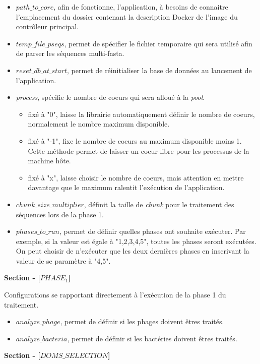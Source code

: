 \begin{itemize}
\item \emph{$path\_to\_core$}, afin de fonctionne, l'application, à besoins de connaitre l'emplacement du dossier contenant la description Docker de l'image du contrôleur principal.
\item \emph{$temp\_file\_pseqs$}, permet de spécifier le fichier temporaire qui sera utilisé afin de parser les séquences multi-fasta. 
\item \emph{$reset\_db\_at\_start$}, permet de réinitialiser la base de données au lancement de l'application.
\item \emph{process}, spécifie le nombre de coeurs qui sera alloué à la \emph{pool}. 
\begin{itemize}
\item fixé à "0", laisse la librairie automatiquement définir le nombre de coeurs, normalement le nombre maximum disponible.
\item fixé à "-1", fixe le nombre de coeurs au maximum disponible moins 1. Cette méthode permet de laisser un coeur libre pour les processus de la machine hôte.
\item fixé à "x", laisse choisir le nombre de coeurs, mais attention en mettre davantage que le maximum ralentit l'exécution de l'application.
\end{itemize}
\item \emph{$chunk\_size\_multiplier$}, définit la taille de \emph{chunk} pour le traitement des séquences lors de la phase 1.
\item \emph{$phases\_to\_run$}, permet de définir quelles phases ont souhaite exécuter. Par exemple, si la valeur est égale à "1,2,3,4,5", toutes les phases seront exécutées. On peut choisir de n'exécuter que les deux dernières phases en inscrivant la valeur de se paramètre à "4,5".
\end{itemize}

\textbf{Section - [$PHASE_1$]}

Configurations se rapportant directement à l'exécution de la phase 1 du traitement.

\begin{itemize}
\item \emph{$analyze\_phage$}, permet de définir si les phages doivent êtres traités.
\item \emph{$analyze\_bacteria$}, permet de définir si les bactéries doivent êtres traités.
\end{itemize}

\textbf{Section - [$DOMS\_SELECTION$]}

